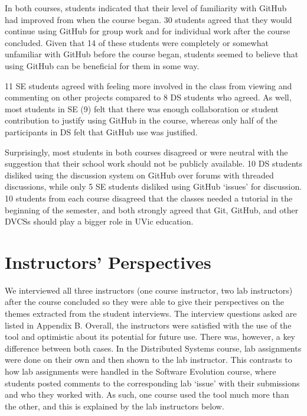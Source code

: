 In both courses, students indicated that their level of familiarity with GitHub had improved from when the course began. 30 students agreed that they would continue using GitHub for group work and for individual work after the course concluded. Given that 14 of these students were completely or somewhat unfamiliar with GitHub before the course began, students seemed to believe that using GitHub can be beneficial for them in some way.

11 SE students agreed with feeling more involved in the class from viewing and commenting on other projects compared to 8 DS students who agreed. As well, most students in SE (9) felt that there was enough collaboration or student contribution to justify using GitHub in the course, whereas only half of the participants in DS felt that GitHub use was justified.

Surprisingly, most students in both courses disagreed or were neutral with the suggestion that their school work should not be publicly available. 10 DS students disliked using the discussion system on GitHub over forums with threaded discussions, while only 5 SE students disliked using GitHub `issues' for discussion. 10 students from each course disagreed that the classes needed a tutorial in the beginning of the semester, and both strongly agreed that Git, GitHub, and other DVCSs should play a bigger role in UVic education.

\section{Instructors' Perspectives}
We interviewed all three instructors (one course instructor, two lab instructors) after the course concluded so they were able to give their perspectives on the themes extracted from the student interviews. The interview questions asked are listed in Appendix B. Overall, the instructors were satisfied with the use of the tool and optimistic about its potential for future use. There was, however, a key difference between both cases. In the Distributed Systems course, lab assignments were done on their own and then shown to the lab instructor. This contrasts to how lab assignments were handled in the Software Evolution course, where students posted comments to the corresponding lab `issue' with their submissions and who they worked with. As such, one course used the tool much more than the other, and this is explained by the lab instructors below.

